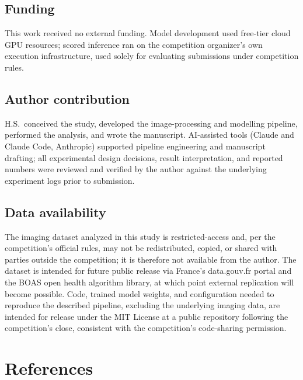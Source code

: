 \documentclass[11pt]{article}
\begin{document}
\subsection*{Funding}
This work received no external funding. Model development used free-tier cloud GPU resources; scored inference ran on the competition organizer's own execution infrastructure, used solely for evaluating submissions under competition rules.

\subsection*{Author contribution}
H.S.\ conceived the study, developed the image-processing and modelling pipeline, performed the analysis, and wrote the manuscript. AI-assisted tools (Claude and Claude Code, Anthropic) supported pipeline engineering and manuscript drafting; all experimental design decisions, result interpretation, and reported numbers were reviewed and verified by the author against the underlying experiment logs prior to submission.

\subsection*{Data availability}
The imaging dataset analyzed in this study is restricted-access and, per the competition's official rules, may not be redistributed, copied, or shared with parties outside the competition; it is therefore not available from the author. The dataset is intended for future public release via France's data.gouv.fr portal and the BOAS open health algorithm library, at which point external replication will become possible. Code, trained model weights, and configuration needed to reproduce the described pipeline, excluding the underlying imaging data, are intended for release under the MIT License at a public repository following the competition's close, consistent with the competition's code-sharing permission.

\bigskip
\section*{References}
\end{document}
